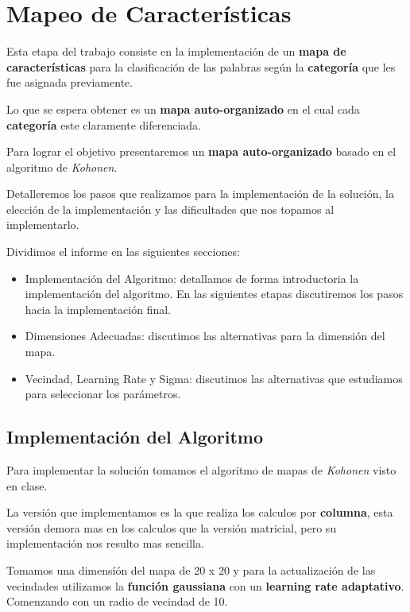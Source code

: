 
\section{Mapeo de Características}

Esta etapa del trabajo consiste en la implementación de un \textbf{mapa
de características} para la clasificación de las palabras según
la \textbf{categoría} que les fue asignada previamente.

Lo que se espera obtener es un \textbf{mapa auto-organizado} en el cual
cada \textbf{categoría} este claramente diferenciada.

Para lograr el objetivo presentaremos un \textbf{mapa auto-organizado} 
basado en el algoritmo de \emph{Kohonen}.

Detalleremos los pasos que realizamos para la implementación de la solución,
la elección de la implementación y las dificultades que nos topamos al
implementarlo.

Dividimos el informe en las siguientes secciones:

\begin{itemize}
\item Implementación del Algoritmo: detallamos de forma introductoria la
implementación del algoritmo. En las siguientes etapas discutiremos los pasos
hacia la implementación final.
\item Dimensiones Adecuadas: discutimos las alternativas para la dimensión
del mapa.
\item Vecindad, Learning Rate y Sigma: discutimos las alternativas que
estudiamos para seleccionar los parámetros.
\end{itemize}

\subsection{Implementación del Algoritmo}

Para implementar la solución tomamos el algoritmo de mapas
de \emph{Kohonen} visto en clase.

La versión que implementamos es la que realiza los calculos 
por \textbf{columna}, esta versión demora mas en los calculos 
que la versión matricial, pero su implementación nos resulto mas 
sencilla.

Tomamos una dimensíón del mapa de 20 x 20 y para la actualización 
de las vecindades utilizamos la \textbf{función gaussiana} con un 
\textbf{learning rate adaptativo}. Comenzando con un radio de 
vecindad de 10.

